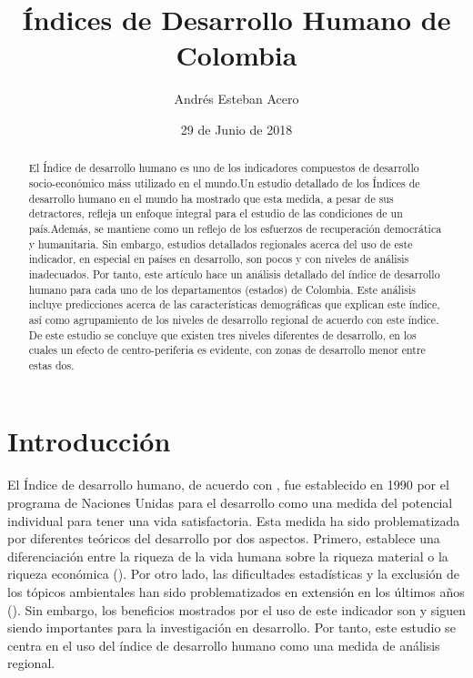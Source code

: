 \documentclass{article}
\title{Índices de Desarrollo Humano de Colombia}
\author[1]{\normalsize Andrés Esteban Acero}
\affil[1]{\small  Doctorado en Ingeniería Industrial, Facultad de Ingeniería,Universidad de los Andes\\
\texttt{{ae.acero539@uniandes.edu.co}}}
\date{29 de Junio de 2018}
\begin{document}


\maketitle

\begin{abstract}
El Índice de desarrollo humano es uno de los indicadores compuestos de desarrollo socio-económico máss utilizado en el mundo.Un estudio detallado de los Índices de desarrollo humano en el mundo ha mostrado que esta medida, a pesar de sus detractores, refleja un enfoque integral para el estudio de las condiciones de un país.Además, se mantiene como un reflejo de los esfuerzos de recuperación democrática y humanitaria.  Sin embargo, estudios detallados regionales acerca del uso de este indicador, en especial en países en desarrollo, son pocos y con niveles de análisis inadecuados. Por tanto, este artículo hace un análisis detallado del índice de desarrollo humano para cada uno de los departamentos (estados) de Colombia. Este análisis incluye predicciones acerca de las características demográficas que explican este índice, así como agrupamiento de los niveles de desarrollo regional de acuerdo con este índice. De este estudio se concluye que existen tres niveles diferentes de desarrollo, en los cuales un efecto de centro-periferia es evidente, con zonas de desarrollo menor entre estas dos.
\end{abstract}

\section*{Introducción}
El Índice de desarrollo humano, de acuerdo con \cite{sales_proposal_2018}, fue establecido en 1990 por el programa de Naciones Unidas para el desarrollo como una medida del potencial individual para tener una vida satisfactoria. Esta medida ha sido problematizada por diferentes teóricos del desarrollo por dos aspectos. Primero, establece una diferenciación entre la riqueza de la vida humana sobre la riqueza material o la riqueza económica (\cite{sales_proposal_2018}). Por otro lado, las dificultades estadísticas y la exclusión de los tópicos ambientales han sido problematizados en extensión en los últimos años (\cite{biggeri_towards_2018}). Sin embargo, los beneficios mostrados por el uso de este indicador son y siguen siendo importantes para la investigación en desarrollo. Por tanto, este estudio se centra en el uso del índice de desarrollo humano como una medida de análisis regional.
\clearpage
\end{document}
